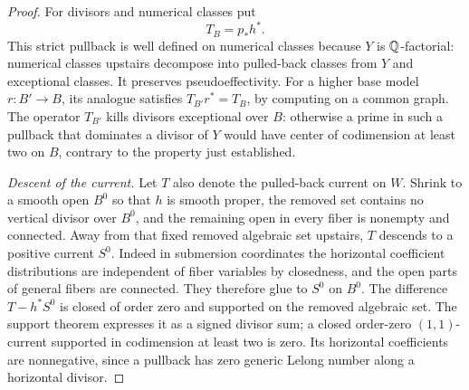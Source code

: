 \begin{proof}
For divisors and numerical classes put
\[
 T_B=p_*h^*.
\]
This strict pullback is well defined on numerical classes because
\(Y\) is \(\mathbb{Q}\)-factorial: numerical classes upstairs decompose
into pulled-back classes from \(Y\) and exceptional classes.
It preserves pseudoeffectivity. For a higher base model
\(r:B'\to B\), its analogue satisfies
\(T_{B'}r^*=T_B\), by computing on a common graph.
The operator \(T_{B'}\) kills divisors exceptional over \(B\):
otherwise a prime in such a pullback that dominates a divisor of \(Y\) would
have center of codimension at least two on \(B\), contrary
to the property just established.

\smallskip
\noindent\emph{Descent of the current.}
Let \(T\) also denote the pulled-back current on \(W\).
Shrink to a smooth open \(B^0\) so that \(h\) is smooth
proper, the removed set contains no vertical divisor
over \(B^0\), and the remaining open in every fiber is
nonempty and connected. Away from that fixed removed
algebraic set upstairs, \(T\) descends to a positive current
\(S^0\).
Indeed in submersion coordinates the horizontal coefficient
distributions are independent of fiber variables by closedness,
and the open parts of general fibers are connected. They
therefore glue to \(S^0\) on \(B^0\). The difference
\(T-h^*S^0\) is closed of order zero and supported on the
removed algebraic set. The support theorem expresses it as a
signed divisor sum; a closed order-zero \((1,1)\)-current
supported in codimension at least two is zero. Its horizontal coefficients are
nonnegative, since a pullback has zero generic Lelong number
along a horizontal divisor.


\end{proof}

